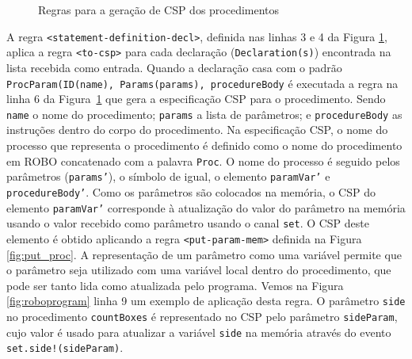 \begin{figure}[!h]
\centering
\caption{Regras para a geração de CSP dos procedimentos}

\label{fig:rules_proc}
\end{figure}

A regra \texttt{<statement-definition-decl>}, definida nas linhas 3 e 4 da Figura \ref{fig:rules_proc}, aplica a regra \texttt{<to-csp>} para cada declaração (\texttt{Declaration(s)}) encontrada na lista recebida como entrada. 
Quando a declaração casa com o padrão \texttt{ProcParam(ID(name), Params(params), procedureBody} é executada a regra na linha 6 da Figura~\ref{fig:rules_proc} que gera a especificação CSP para o procedimento. Sendo \texttt{name} o nome do procedimento; \texttt{params} a lista de parâmetros; e \texttt{procedureBody} as instruções dentro do corpo do procedimento. Na especificação CSP, o nome do processo que representa o procedimento é definido como o nome do procedimento em ROBO concatenado com a palavra \texttt{Proc}. O nome do processo é seguido pelos parâmetros (\texttt{params'}), o símbolo de igual, o elemento \texttt{paramVar'} e \texttt{procedureBody'}. Como os parâmetros são colocados na memória, o CSP do elemento \texttt{paramVar'} corresponde à atualização do valor do parâmetro na memória usando o valor recebido como parâmetro usando o canal \texttt{set}. O CSP deste elemento é obtido aplicando a regra \texttt{<put-param-mem>} definida na Figura \ref{fig:put_proc}. A representação de um parâmetro como uma variável permite que o parâmetro seja utilizado com uma variável local dentro do procedimento, que pode ser tanto lida como atualizada pelo programa. 
Vemos na Figura \ref{fig:roboprogram} linha 9 um exemplo de aplicação desta regra. O parâmetro \texttt{side} no procedimento \texttt{countBoxes} é representado no  CSP pelo parâmetro \texttt{sideParam}, cujo valor é usado para atualizar a variável \texttt{side} na memória através do evento \texttt{set.side!(sideParam)}.


